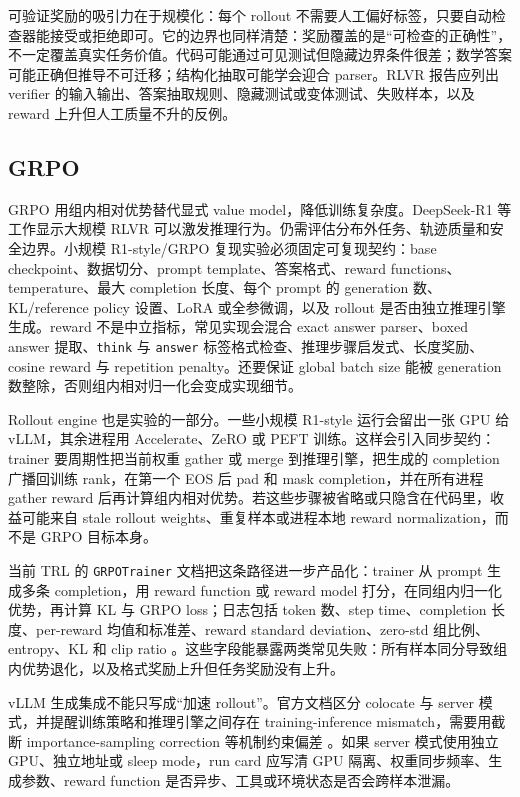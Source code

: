 \documentclass[UTF8,zihao=-4,openany]{ctexbook}
\begin{document}
可验证奖励的吸引力在于规模化：每个 rollout 不需要人工偏好标签，只要自动检查器能接受或拒绝即可。它的边界也同样清楚：奖励覆盖的是“可检查的正确性”，不一定覆盖真实任务价值。代码可能通过可见测试但隐藏边界条件很差；数学答案可能正确但推导不可迁移；结构化抽取可能学会迎合 parser。RLVR 报告应列出 verifier 的输入输出、答案抽取规则、隐藏测试或变体测试、失败样本，以及 reward 上升但人工质量不升的反例。

\subsection{GRPO}
GRPO 用组内相对优势替代显式 value model，降低训练复杂度。DeepSeek-R1 等工作显示大规模 RLVR 可以激发推理行为。仍需评估分布外任务、轨迹质量和安全边界。小规模 R1-style/GRPO 复现实验必须固定可复现契约：base checkpoint、数据切分、prompt template、答案格式、reward functions、temperature、最大 completion 长度、每个 prompt 的 generation 数、KL/reference policy 设置、LoRA 或全参微调，以及 rollout 是否由独立推理引擎生成。reward 不是中立指标，常见实现会混合 exact answer parser、boxed answer 提取、\texttt{think} 与 \texttt{answer} 标签格式检查、推理步骤启发式、长度奖励、cosine reward 与 repetition penalty。还要保证 global batch size 能被 generation 数整除，否则组内相对归一化会变成实现细节。

Rollout engine 也是实验的一部分。一些小规模 R1-style 运行会留出一张 GPU 给 vLLM，其余进程用 Accelerate、ZeRO 或 PEFT 训练。这样会引入同步契约：trainer 要周期性把当前权重 gather 或 merge 到推理引擎，把生成的 completion 广播回训练 rank，在第一个 EOS 后 pad 和 mask completion，并在所有进程 gather reward 后再计算组内相对优势。若这些步骤被省略或只隐含在代码里，收益可能来自 stale rollout weights、重复样本或进程本地 reward normalization，而不是 GRPO 目标本身。

当前 TRL 的 \texttt{GRPOTrainer} 文档把这条路径进一步产品化：trainer 从 prompt 生成多条 completion，用 reward function 或 reward model 打分，在同组内归一化优势，再计算 KL 与 GRPO loss；日志包括 token 数、step time、completion 长度、per-reward 均值和标准差、reward standard deviation、zero-std 组比例、entropy、KL 和 clip ratio \cite{huggingface2026trlgrpotrainer}。这些字段能暴露两类常见失败：所有样本同分导致组内优势退化，以及格式奖励上升但任务奖励没有上升。

vLLM 生成集成不能只写成“加速 rollout”。官方文档区分 colocate 与 server 模式，并提醒训练策略和推理引擎之间存在 training-inference mismatch，需要用截断 importance-sampling correction 等机制约束偏差 \cite{huggingface2026trlgrpotrainer}。如果 server 模式使用独立 GPU、独立地址或 sleep mode，run card 应写清 GPU 隔离、权重同步频率、生成参数、reward function 是否异步、工具或环境状态是否会跨样本泄漏。
\end{document}
